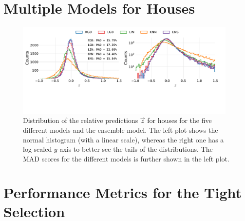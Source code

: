 \section{Multiple Models for Houses}
\begin{figure}[ht!]
  \centerfloat
  \includegraphics[draft=false, width=0.98\textwidth, trim=10 130 40 10, clip]{figures/housing/Villa_v19_cut_all_Ncols_all_all_models.pdf}
  \caption[Performance Comparison of Multiple Models for Houses]
          {Distribution of the relative predictions $\vec{z}$ for houses for the five different models and the ensemble model. The left plot shows the normal histogram (with a linear scale), whereas the right one has a log-scaled $y$-axis to better see the tails of the distributions. The MAD scores for the different models is further shown in the left plot.} 
  \label{fig:h:multiple_models_villa}
\end{figure}
\clearpage


\FloatBarrier
\section{Performance Metrics for the Tight Selection}

